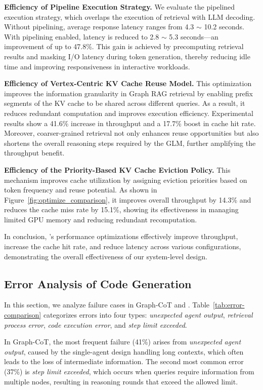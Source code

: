 \noindent\textbf{Efficiency of Pipeline Execution Strategy.}  
We evaluate the pipelined execution strategy, which overlaps the execution of retrieval with LLM decoding. Without pipelining, average response latency ranges from 4.3 $\sim$ 10.2 seconds. With pipelining enabled, latency is reduced to 2.8 $\sim$ 5.3 seconds—an improvement of up to 47.8\%. This gain is achieved by precomputing retrieval results and masking I/O latency during token generation, thereby reducing idle time and improving responsiveness in interactive workloads.

\noindent\textbf{Efficiency of Vertex-Centric KV Cache Reuse Model.}  
This optimization improves the information granularity in Graph RAG retrieval by enabling prefix segments of the KV cache to be shared across different queries. As a result, it reduces redundant computation and improves execution efficiency. Experimental results show a 41.6\% increase in throughput and a 17.7\% boost in cache hit rate. Moreover, coarser-grained retrieval not only enhances reuse opportunities but also shortens the overall reasoning steps required by the GLM, further amplifying the throughput benefit.

\noindent\textbf{Efficiency of the Priority-Based KV Cache Eviction Policy.}  
This mechanism improves cache utilization by assigning eviction priorities based on token frequency and reuse potential. As shown in Figure~\ref{fig:optimize_comparison}, it improves overall throughput by 14.3\% and reduces the cache miss rate by 15.1\%, showing its effectiveness in managing limited GPU memory and reducing redundant recomputation.

In conclusion, \projectname's performance optimizations effectively improve throughput, increase the cache hit rate, and reduce latency across various configurations, demonstrating the overall effectiveness of our system-level design.

\subsection{Error Analysis of Code Generation}

In this section, we analyze failure cases in Graph-CoT and \projectname. Table~\ref{tab:error-comparison} categorizes errors into four types: \emph{unexpected agent output}, \emph{retrieval process error}, \emph{code execution error}, and \emph{step limit exceeded}.  

In Graph-CoT, the most frequent failure (41\%) arises from \emph{unexpected agent output}, caused by the single-agent design handling long contexts, which often leads to the loss of intermediate information. The second most common error (37\%) is \emph{step limit exceeded}, which occurs when queries require information from multiple nodes, resulting in reasoning rounds that exceed the allowed limit.  

